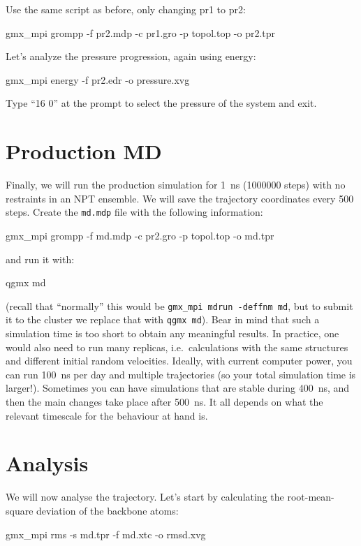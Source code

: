 \documentclass[10pt]{article}
\begin{document}
Use the same script as before, only changing pr1 to pr2:

\begin{cmdline}
gmx_mpi grompp -f pr2.mdp -c pr1.gro -p topol.top -o pr2.tpr
\end{cmdline}

Let's analyze the pressure progression, again using energy:
\begin{cmdline}
gmx_mpi energy -f pr2.edr -o pressure.xvg
\end{cmdline}

Type ``16 0'' at the prompt to select the pressure of the system and exit. 


\section{Production MD}
Finally,  we will run the production simulation for 1~ns (1000000 steps) with no restraints in an NPT ensemble. We will save the trajectory coordinates every 500 steps. Create the \texttt{md.mdp} file with the following information:
 
\begin{cmdline}
gmx_mpi grompp -f md.mdp -c pr2.gro -p topol.top -o md.tpr
\end{cmdline}

and run it with:

\begin{cmdline}
qgmx md
\end{cmdline}

(recall that ``normally'' this would be \texttt{gmx\_mpi mdrun -deffnm md}, but to submit it to the cluster we replace that with \texttt{qgmx md}). Bear in mind that such a simulation time is too short to obtain any meaningful results. In practice, one would also need to run many replicas, i.e.\ calculations with the same structures and different initial random velocities. Ideally, with current computer power, you can run 100~ns per day and multiple trajectories (so your total simulation time is larger!). Sometimes you can have simulations that are stable during 400~ns, and then the main changes take place after 500~ns. It all depends on what the relevant timescale for the behaviour at hand is.

\section{Analysis}
We will now analyse the trajectory. Let's start by calculating the root-mean-square deviation of the backbone atoms:
\begin{cmdline}
gmx_mpi rms -s md.tpr -f md.xtc -o rmsd.xvg
\end{cmdline}
\end{document}

